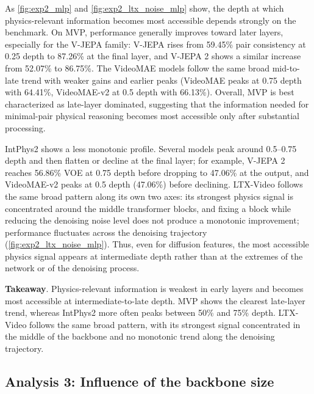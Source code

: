 As \autoref{fig:exp2_mlp} and \autoref{fig:exp2_ltx_noise_mlp} show, the depth
at which physics-relevant information becomes most accessible depends strongly
on the benchmark. On MVP, performance generally improves toward later layers,
especially for the V-JEPA family: V-JEPA rises from 59.45\% pair consistency at
0.25 depth to 87.26\% at the final layer, and V-JEPA 2 shows a similar increase
from 52.07\% to 86.75\%. The VideoMAE models follow the same broad mid-to-late
trend with weaker gains and earlier peaks (VideoMAE peaks at 0.75 depth with
64.41\%, VideoMAE-v2 at 0.5 depth with 66.13\%). Overall, MVP is best
characterized as late-layer dominated, suggesting that the information needed
for minimal-pair physical reasoning becomes most accessible only after
substantial processing.

IntPhys2 shows a less monotonic profile. Several models peak around 0.5--0.75
depth and then flatten or decline at the final layer; for example, V-JEPA 2
reaches 56.86\% VOE at 0.75 depth before dropping to 47.06\% at the output, and
VideoMAE-v2 peaks at 0.5 depth (47.06\%) before declining. LTX-Video follows
the same broad pattern along its own two axes: its strongest physics signal is
concentrated around the middle transformer blocks, and fixing a block while
reducing the denoising noise level does not produce a monotonic improvement;
performance fluctuates across the denoising trajectory
(\autoref{fig:exp2_ltx_noise_mlp}). Thus, even for diffusion features, the most
accessible physics signal appears at intermediate depth rather than at the
extremes of the network or of the denoising process.

\begin{takeawaybox}
\textbf{Takeaway}.
Physics-relevant information is weakest in early layers and becomes most
accessible at intermediate-to-late depth. MVP shows the clearest late-layer
trend, whereas IntPhys2 more often peaks between 50\% and 75\% depth. LTX-Video
follows the same broad pattern, with its strongest signal concentrated in the
middle of the backbone and no monotonic trend along the denoising trajectory.
\end{takeawaybox}

\subsection*{Analysis 3: Influence of the backbone size}
\label{sec:exp3}


